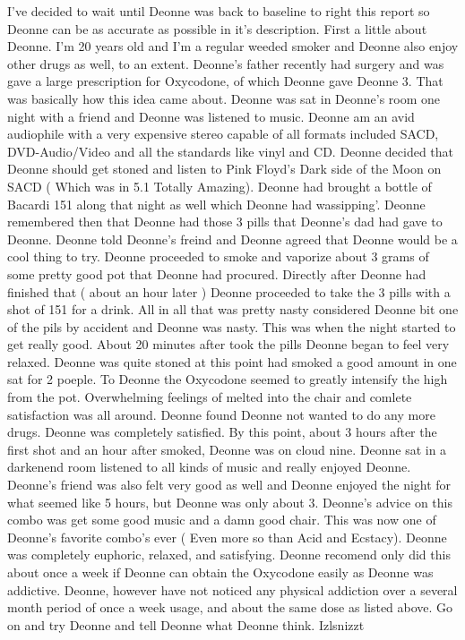 \documentclass[12pt]{book}
\begin{document}
I've decided to wait until Deonne was back to baseline to right this report so Deonne can be as accurate as possible in it's description. First a little about Deonne. I'm 20 years old and I'm a regular weeded smoker and Deonne also enjoy other drugs as well, to an extent. Deonne's father recently had surgery and was gave a large prescription for Oxycodone, of which Deonne gave Deonne 3. That was basically how this idea came about. Deonne was sat in Deonne's room one night with a friend and Deonne was listened to music. Deonne am an avid audiophile with a very expensive stereo capable of all formats included SACD, DVD-Audio/Video and all the standards like vinyl and CD. Deonne decided that Deonne should get stoned and listen to Pink Floyd's Dark side of the Moon on SACD ( Which was in 5.1 Totally Amazing). Deonne had brought a bottle of Bacardi 151 along that night as well which Deonne had wassipping'. Deonne remembered then that Deonne had those 3 pills that Deonne's dad had gave to Deonne. Deonne told Deonne's freind and Deonne agreed that Deonne would be a cool thing to try. Deonne proceeded to smoke and vaporize about 3 grams of some pretty good pot that Deonne had procured. Directly after Deonne had finished that ( about an hour later ) Deonne proceeded to take the 3 pills with a shot of 151 for a drink. All in all that was pretty nasty considered Deonne bit one of the pils by accident and Deonne was nasty. This was when the night started to get really good. About 20 minutes after took the pills Deonne began to feel very relaxed. Deonne was quite stoned at this point had smoked a good amount in one sat for 2 poeple. To Deonne the Oxycodone seemed to greatly intensify the high from the pot. Overwhelming feelings of melted into the chair and comlete satisfaction was all around. Deonne found Deonne not wanted to do any more drugs. Deonne was completely satisfied. By this point, about 3 hours after the first shot and an hour after smoked, Deonne was on cloud nine. Deonne sat in a darkenend room listened to all kinds of music and really enjoyed Deonne. Deonne's friend was also felt very good as well and Deonne enjoyed the night for what seemed like 5 hours, but Deonne was only about 3. Deonne's advice on this combo was get some good music and a damn good chair. This was now one of Deonne's favorite combo's ever ( Even more so than Acid and Ecstacy). Deonne was completely euphoric, relaxed, and satisfying. Deonne recomend only did this about once a week if Deonne can obtain the Oxycodone easily as Deonne was addictive. Deonne, however have not noticed any physical addiction over a several month period of once a week usage, and about the same dose as listed above. Go on and try Deonne and tell Deonne what Deonne think. Izlsnizzt
\end{document}
